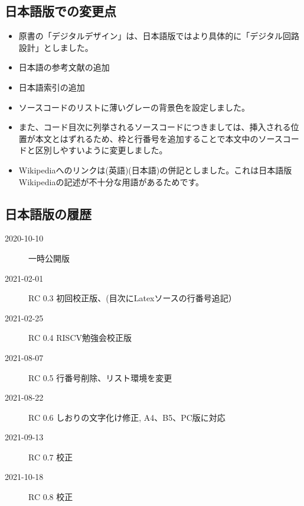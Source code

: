 \documentclass[%
    10pt,
    headinclude, footexclude,
    openright, %
    notitlepage,
    cleardoubleempty,
    headsepline,
    pointlessnumbers,
    bibtotoc, idxtotoc,
    ]{scrbook}
\newif\ifshoworiginal
\newif\ifshowtrans
\begin{document}
\begin{flushleft}
\subsection*{日本語版での変更点}

\begin{itemize}
    \item 原書の「デジタルデザイン」は、日本語版ではより具体的に「デジタル回路設計」としました。
    \item 日本語の参考文献の追加
    \item 日本語索引の追加
    \item ソースコードのリストに薄いグレーの背景色を設定しました。
    \item また、コード目次に列挙されるソースコードにつきましては、挿入される位置が本文とはずれるため、枠と行番号を追加することで本文中のソースコードと区別しやすいように変更しました。
    \item Wikipediaへのリンクは(英語)(日本語)の併記としました。これは日本語版Wikipediaの記述が不十分な用語があるためです。
\end{itemize}

\subsection*{日本語版の履歴}

\begin{description}
\item[2020-10-10] 一時公開版
\item[2021-02-01] RC 0.3 初回校正版、(目次にLatexソースの行番号追記）
\item[2021-02-25] RC 0.4 RISCV勉強会校正版
\item[2021-08-07] RC 0.5 行番号削除、リスト環境を変更
\item[2021-08-22] RC 0.6 しおりの文字化け修正, A4、B5、PC版に対応
\item[2021-09-13] RC 0.7 校正
\item[2021-10-18] RC 0.8 校正
\end{description}

\fi %

\mainmatter

\ifshoworiginal
\chapter{Introduction}
\fi
\ifshowtrans %
\chapter{はじめに} %
\fi


\end{flushleft}
\end{document}
